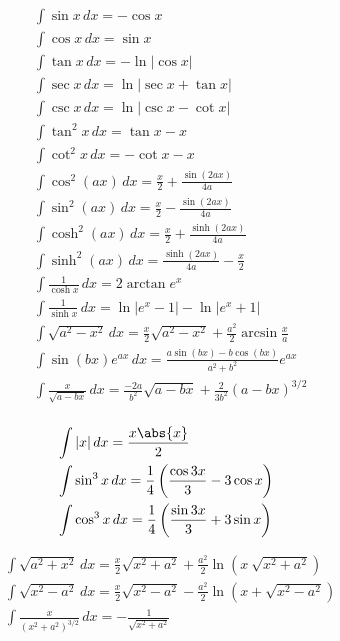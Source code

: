 \begin{minipage}{0.55\textwidth}
\begin{equation}
\begin{split}
    &\int \sin{x}\,dx = -\cos{x} \\
    &\int \cos{x}\,dx = \sin{x} \\
    &\int\tan{x}\,dx  = -\ln{|\cos{x}|} \\
    &\int\sec{x}\,dx  = \ln{|\sec{x}+\tan{x}|}\\
    &\int\csc{x}\,dx  = \ln{|\csc{x}-\cot{x}|}\\
    &\int\tan^2{x}\,dx  = \tan{x}-x \\
    &\int\cot^2{x}\,dx  = -\cot{x}-x \\
    &\int\cos^2{(ax)}\,dx  = \frac{x}{2}+\frac{\sin{(2ax)}}{4a}\\
    &\int\sin^2{(ax)}\,dx  = \frac{x}{2}-\frac{\sin{(2ax)}}{4a}\\
    &\int\cosh^2{(ax)}\,dx  = \frac{x}{2}+\frac{\sinh{(2ax)}}{4a}\\
    &\int\sinh^2{(ax)}\,dx  = \frac{\sinh{(2ax)}}{4a}-\frac{x}{2}\\
    &\int\frac{1}{\cosh{x}}\,dx  = 2\arctan{e^x}\\
    &\int\frac{1}{\sinh{x}}\,dx  = \ln{|e^x-1|}-\ln{|e^x+1|}\\
    &\int\sqrt{a^2-x^2}\,dx  = \frac{x}{2}\sqrt{a^2-x^2}+\frac{a^2}{2}\arcsin{\frac{x}{a}}\\
    &\int\sin{(bx)}e^{ax}\,dx=\frac{a\sin{(bx)}-b\cos{(bx)}}{a^2+b^2}e^{ax}\\
    &\int\frac{x}{\sqrt{a-bx}}\,dx= \frac{-2a}{b^2}\sqrt{a-bx}+\frac{2}{3b^2}(a-bx)^{3/2}\\
\end{split}
\nonumber
\end{equation}
\end{minipage}
\newpage
\begin{minipage}{0.55\textwidth}
\begin{equation}
\begin{split}
    &\int|x|\,dx  = \frac{x\abs{x}}{2}\\
    &\int \sin^3{x}\,dx = \frac{1}{4}\left(\frac{\cos{3x}}{3}-3\cos{x}\right)\\
    &\int \cos^3{x}\,dx = \frac{1}{4}\left(\frac{\sin{3x}}{3}+3\sin{x}\right)\\
\end{split}
\nonumber
\end{equation}
\end{minipage}
\begin{minipage}{0.55\textwidth}
\begin{equation}
\begin{split}
    &\int\sqrt{a^2+x^2}\,dx = \frac{x}{2}\sqrt{x^2+a^2}+\frac{a^2}{2}\ln{(x~\sqrt{x^2+a^2})}\\
    &\int\sqrt{x^2-a^2}\,dx = \frac{x}{2}\sqrt{x^2-a^2}-\frac{a^2}{2}\ln{(x+\sqrt{x^2-a^2})}\\
    &\int\frac{x}{(x^2+a^2)^{3/2}}\,dx = -\frac{1}{\sqrt{x^2 + a^2}}\\
\end{split}
\nonumber
\end{equation}
\end{minipage}

